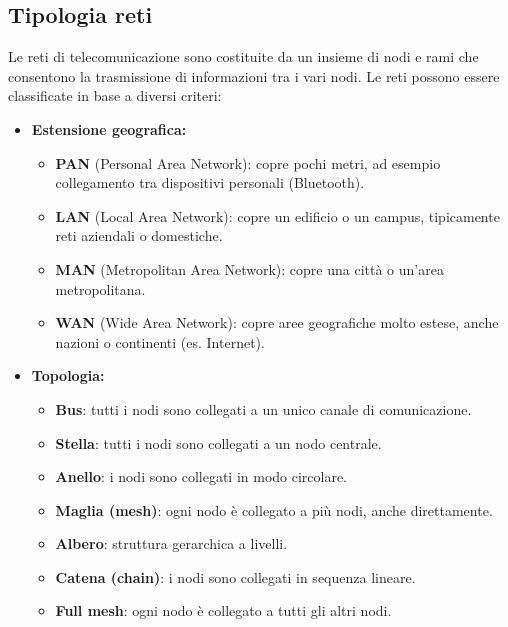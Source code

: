 \subsection{Tipologia reti}
Le reti di telecomunicazione sono costituite da un insieme di nodi e rami che consentono la trasmissione di informazioni tra i vari nodi. Le reti possono essere classificate in base a diversi criteri:
\begin{itemize}
    \item \textbf{Estensione geografica:}
    \begin{itemize}
        \item \textbf{PAN} (Personal Area Network): copre pochi metri, ad esempio collegamento tra dispositivi personali (Bluetooth).
        \item \textbf{LAN} (Local Area Network): copre un edificio o un campus, tipicamente reti aziendali o domestiche.
        \item \textbf{MAN} (Metropolitan Area Network): copre una città o un'area metropolitana.
        \item \textbf{WAN} (Wide Area Network): copre aree geografiche molto estese, anche nazioni o continenti (es. Internet).
    \end{itemize}
    
    \newpage
    \item \textbf{Topologia:}
    \begin{itemize}
        \item \textbf{Bus}: tutti i nodi sono collegati a un unico canale di comunicazione.
        \item \textbf{Stella}: tutti i nodi sono collegati a un nodo centrale.
        \item \textbf{Anello}: i nodi sono collegati in modo circolare.
        \item \textbf{Maglia (mesh)}: ogni nodo è collegato a più nodi, anche direttamente.
        \item \textbf{Albero}: struttura gerarchica a livelli.
        \item \textbf{Catena (chain)}: i nodi sono collegati in sequenza lineare.
        \item \textbf{Full mesh}: ogni nodo è collegato a tutti gli altri nodi.
    \end{itemize}

\end{itemize}
